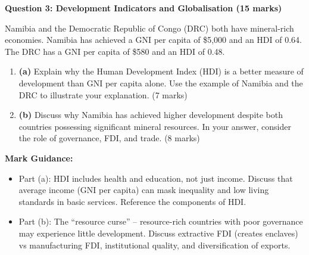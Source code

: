 \documentclass[11pt, a4paper, twoside]{book}
\begin{document}
\begin{exampractice}

\textbf{Question 3: Development Indicators and Globalisation (15 marks)}

Namibia and the Democratic Republic of Congo (DRC) both have mineral-rich economies. Namibia has achieved a GNI per capita of \$5,000 and an HDI of 0.64. The DRC has a GNI per capita of \$580 and an HDI of 0.48.

\begin{enumerate}
  \item \textbf{(a)} Explain why the Human Development Index (HDI) is a better measure of development than GNI per capita alone. Use the example of Namibia and the DRC to illustrate your explanation. (7 marks)

  \item \textbf{(b)} Discuss why Namibia has achieved higher development despite both countries possessing significant mineral resources. In your answer, consider the role of governance, FDI, and trade. (8 marks)
\end{enumerate}

\textbf{Mark Guidance:}
\begin{itemize}
  \item Part (a): HDI includes health and education, not just income. Discuss that average income (GNI per capita) can mask inequality and low living standards in basic services. Reference the components of HDI.
  \item Part (b): The ``resource curse'' -- resource-rich countries with poor governance may experience little development. Discuss extractive FDI (creates enclaves) vs manufacturing FDI, institutional quality, and diversification of exports.
\end{itemize}

\end{exampractice}
\end{document}
